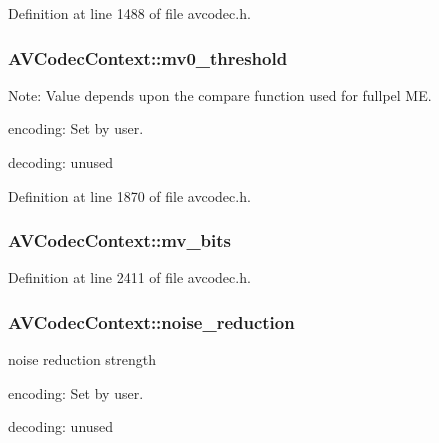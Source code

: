 Definition at line 1488 of file avcodec.\+h.

\subsubsection[{\texorpdfstring{mv0\+\_\+threshold}{mv0_threshold}}]{ A\+V\+Codec\+Context\+::mv0\+\_\+threshold}\hypertarget{struct_a_v_codec_context_aa1f666a5ac597e723e0b64aad4133a02}{}\label{struct_a_v_codec_context_aa1f666a5ac597e723e0b64aad4133a02}
Note\+: Value depends upon the compare function used for fullpel ME.
\begin{DoxyItemize}
\item encoding\+: Set by user.
\item decoding\+: unused 
\end{DoxyItemize}

Definition at line 1870 of file avcodec.\+h.

\subsubsection[{\texorpdfstring{mv\+\_\+bits}{mv_bits}}]{ A\+V\+Codec\+Context\+::mv\+\_\+bits}\hypertarget{struct_a_v_codec_context_a746bd6985c9fa8763d7544c0041c66a9}{}\label{struct_a_v_codec_context_a746bd6985c9fa8763d7544c0041c66a9}


Definition at line 2411 of file avcodec.\+h.

\subsubsection[{\texorpdfstring{noise\+\_\+reduction}{noise_reduction}}]{ A\+V\+Codec\+Context\+::noise\+\_\+reduction}\hypertarget{struct_a_v_codec_context_a04065050e4f8f9b6ca6a302b4a857bbf}{}\label{struct_a_v_codec_context_a04065050e4f8f9b6ca6a302b4a857bbf}
noise reduction strength
\begin{DoxyItemize}
\item encoding\+: Set by user.
\item decoding\+: unused 
\end{DoxyItemize}

